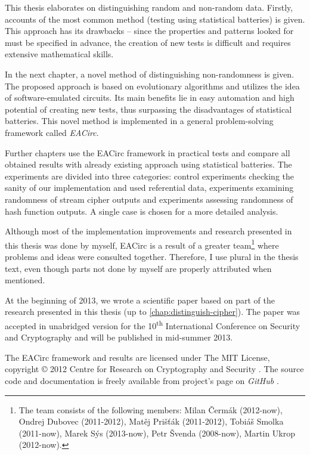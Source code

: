 \documentclass[12pt,twoside]{fithesis2}		%
\renewcommand{\_}{\leavevmode \kern0.0em\vbox{\hrule width0.4em}}
\begin{document}
This thesis elaborates on distinguishing random and non-random data. Firstly, accounts of the most common method (testing using
statistical batteries) is given. This approach has its drawbacks -- since the properties and patterns looked for must be specified
in advance, the creation of new tests is difficult and requires extensive mathematical skills.

In the next chapter, a novel method of distinguishing non-randomness is given. The proposed approach is based on evolutionary
algorithms and utilizes the idea of software-emulated circuits. Its main benefits lie in easy automation and
high potential of creating new tests, thus surpassing the disadvantages of statistical batteries. 
This novel method is implemented in a general problem-solving framework called \textit{EACirc}.

Further chapters use the EACirc framework in practical tests and compare all obtained results with already existing approach
using statistical batteries. The experiments are divided into three categories: control experiments checking the sanity of our
implementation and used referential data, experiments examining randomness of stream cipher outputs and experiments
assessing randomness of hash function outputs. A single case is chosen for a more detailed analysis.

Although most of the implementation improvements and research presented in this thesis was done by myself, EACirc is
a result of a greater team\footnote{The team consists of the following members: Milan Čermák (2012-now), Ondrej Dubovec (2011-2012),
Matěj Prišťák (2011-2012), Tobiáš Smolka (2011-now), Marek Sýs (2013-now), Petr Švenda (2008-now), Martin Ukrop (2012-now).}
where problems and ideas were consulted together. Therefore, I use plural in the thesis text,
even though parts not done by myself are properly attributed when mentioned.

At the beginning of 2013, we wrote a scientific paper based on part of the research presented in this thesis
(up to \autoref{chap:distinguish-cipher}). The paper was accepted in unabridged version for the 10\textsuperscript{th} International
Conference on Security and Cryptography and will be published in mid-summer 2013. \parencite{lab-paper}

The EACirc framework and results are licensed under The MIT License, copyright \copyright{} 2012 Centre for Research 
on Cryptography and Security \parencite{crocs}. The source code and documentation is freely available from project's page on 
\textit{GitHub} \parencite{eacirc-github}.
\end{document}
